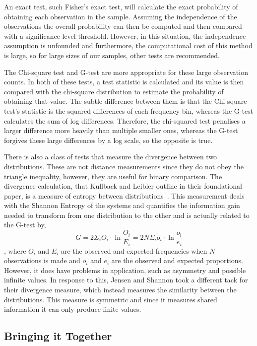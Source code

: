 \documentclass[ %
                    author={Samuel Russell},
                supervisor={Prof. Bogdan Warinschi},
                    degree={MEng},
                     title={Innocuous Ciphertexts},
                  subtitle={The DE-CENSOR Scheme},
                      type={Research},
                      year={2018} ]{dissertation}
\begin{document}
An exact test, such Fisher's exact test, will calculate the exact probability of obtaining each observation in the sample.
Assuming the independence of the observations the overall probability can then be computed and then compared with a significance level threshold.
However, in this situation, the independence assumption is unfounded and furthermore, the computational cost of this method is large, so for large sizes of our samples, other tests are recommended.

The Chi-square test and G-test are more appropriate for these large observation counts. In both of these tests, a test statistic is calculated and its value is then compared with the chi-square distribution to estimate the probability of obtaining that value.
The subtle difference between them is that the Chi-square test's statistic is the squared differences of each frequency bin, whereas the G-test calculates the sum of log differences.
Therefore, the chi-squared test penalises a larger difference more heavily than multiple smaller ones, whereas the G-test forgives these large differences by a log scale, so the opposite is true.

There is also a class of tests that measure the divergence between two distributions.
These are not distance measurements since they do not obey the triangle inequality, however, they are useful for binary comparison.
The divergence calculation, that Kullback and Leibler outline in their foundational paper, is a measure of entropy between distributions~\cite{dist}.
This measurement deals with the Shannon Entropy of the systems and quantifies the information gain needed to transform from one distribution to the other and is actually related to the G-test by,
$$G = 2 \Sigma_i O_i \cdot \ln{\frac{O_i}{E_i}} = 2N \Sigma_i o_i \cdot \ln{\frac{o_i}{e_i}}$$,
where $O_i$ and $E_i$ are the observed and expected frequencies when $N$ observations is made and $o_i$ and $e_i$ are the observed and expected proportions.
However, it does have problems in application, such as asymmetry and possible infinite values.
In response to this, Jensen and Shannon took a different tack for their divergence measure, which instead measures the similarity between the distributions. This measure is symmetric and since it measures shared information it can only produce finite values.

\subsection{Bringing it Together}
\end{document}
